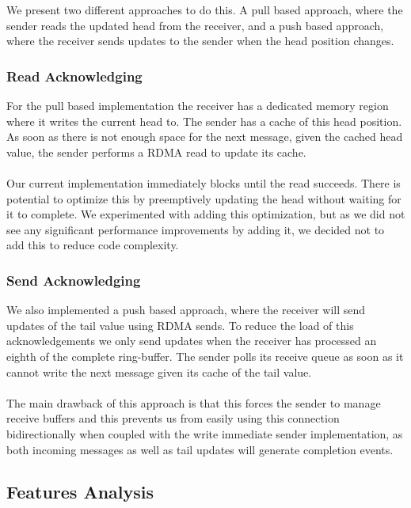 We present two different approaches to do this. A pull based approach, where the sender reads the updated head from the
receiver, and a push based approach, where the receiver sends updates to the sender when the head position changes.

\subsubsection{Read Acknowledging}
For the pull based implementation the receiver has a dedicated memory region where it writes the current 
head to. The sender has a cache of this head position. As soon as there is not enough space for the next message, given 
the cached head value, the sender performs a RDMA read to update its cache.

\paragraph{} Our current implementation immediately blocks until the read succeeds. There is potential to optimize this by preemptively 
updating the head without waiting for it to complete. We experimented with adding this optimization, but as we did not see any significant 
performance improvements by adding it, we decided not to add this to reduce code complexity. 

\subsubsection{Send Acknowledging} 

We also implemented a push based approach, where the receiver will send updates of the tail value using 
RDMA sends. To reduce the load of this acknowledgements we only send updates when the receiver has processed an eighth of 
the complete ring-buffer. The sender polls its receive queue as soon as it cannot write the next message given its
cache of the tail value.

\paragraph{} The main drawback of this approach is that this forces the sender to manage receive buffers and this prevents
us from easily using this connection bidirectionally when coupled with the write immediate sender implementation, as both 
incoming messages as well as tail updates will generate completion events.

\subsection{Features Analysis}

